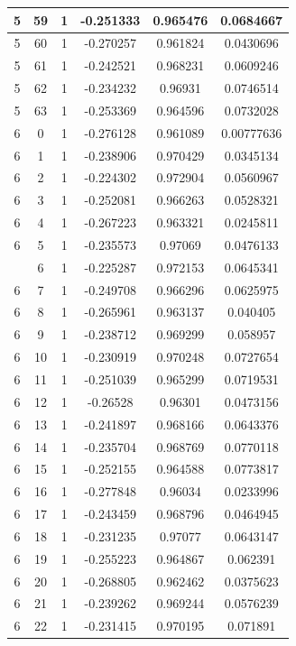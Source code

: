 \documentclass[12pt,a4paper]{article}
\numberwithin{equation}{section}
\numberwithin{figure}{section}
\numberwithin{table}{section}
\begin{document}
\begin{longtable}{|c|c|c|c|c|c|}
5 & 59 & 1 & -0.251333 & 0.965476 & 0.0684667 \\ \hline
5 & 60 & 1 & -0.270257 & 0.961824 & 0.0430696 \\ \hline
5 & 61 & 1 & -0.242521 & 0.968231 & 0.0609246 \\ \hline
5 & 62 & 1 & -0.234232 & 0.96931 & 0.0746514 \\ \hline
5 & 63 & 1 & -0.253369 & 0.964596 & 0.0732028 \\ \hline
6 & 0 & 1 & -0.276128 & 0.961089 & 0.00777636 \\ \hline
6 & 1 & 1 & -0.238906 & 0.970429 & 0.0345134 \\ \hline
6 & 2 & 1 & -0.224302 & 0.972904 & 0.0560967 \\ \hline
6 & 3 & 1 & -0.252081 & 0.966263 & 0.0528321 \\ \hline
6 & 4 & 1 & -0.267223 & 0.963321 & 0.0245811 \\ \hline
6 & 5 & 1 & -0.235573 & 0.97069 & 0.0476133 \\ \hline
\pagebreak
6 & 6 & 1 & -0.225287 & 0.972153 & 0.0645341 \\ \hline
6 & 7 & 1 & -0.249708 & 0.966296 & 0.0625975 \\ \hline
6 & 8 & 1 & -0.265961 & 0.963137 & 0.040405 \\ \hline
6 & 9 & 1 & -0.238712 & 0.969299 & 0.058957 \\ \hline
6 & 10 & 1 & -0.230919 & 0.970248 & 0.0727654 \\ \hline
6 & 11 & 1 & -0.251039 & 0.965299 & 0.0719531 \\ \hline
6 & 12 & 1 & -0.26528 & 0.96301 & 0.0473156 \\ \hline
6 & 13 & 1 & -0.241897 & 0.968166 & 0.0643376 \\ \hline
6 & 14 & 1 & -0.235704 & 0.968769 & 0.0770118 \\ \hline
6 & 15 & 1 & -0.252155 & 0.964588 & 0.0773817 \\ \hline
6 & 16 & 1 & -0.277848 & 0.96034 & 0.0233996 \\ \hline
6 & 17 & 1 & -0.243459 & 0.968796 & 0.0464945 \\ \hline
6 & 18 & 1 & -0.231235 & 0.97077 & 0.0643147 \\ \hline
6 & 19 & 1 & -0.255223 & 0.964867 & 0.062391 \\ \hline
6 & 20 & 1 & -0.268805 & 0.962462 & 0.0375623 \\ \hline
6 & 21 & 1 & -0.239262 & 0.969244 & 0.0576239 \\ \hline
6 & 22 & 1 & -0.231415 & 0.970195 & 0.071891 \\ \hline

\end{longtable}
\end{document}
